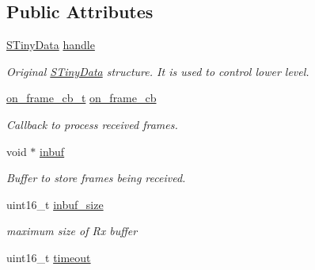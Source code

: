\subsection*{Public Attributes}
\begin{DoxyCompactItemize}
\item 
\hypertarget{structSTinyHdData___a0df5a323cbbfd49fb138b14bca73f14c}{}\hyperlink{structSTinyData}{S\+Tiny\+Data} \hyperlink{structSTinyHdData___a0df5a323cbbfd49fb138b14bca73f14c}{handle}\label{structSTinyHdData___a0df5a323cbbfd49fb138b14bca73f14c}

\begin{DoxyCompactList}\small\item\em Original \hyperlink{structSTinyData}{S\+Tiny\+Data} structure. It is used to control lower level. \end{DoxyCompactList}\item 
\hypertarget{structSTinyHdData___abf8a0eb5006769a92adc186554a3a1c0}{}\hyperlink{tiny__layer2_8h_ad6bf709565b8aecb9e6ecf196f219d54}{on\+\_\+frame\+\_\+cb\+\_\+t} \hyperlink{structSTinyHdData___abf8a0eb5006769a92adc186554a3a1c0}{on\+\_\+frame\+\_\+cb}\label{structSTinyHdData___abf8a0eb5006769a92adc186554a3a1c0}

\begin{DoxyCompactList}\small\item\em Callback to process received frames. \end{DoxyCompactList}\item 
\hypertarget{structSTinyHdData___a69a6bb34b580bcfa5e13112cb7652d1d}{}void $\ast$ \hyperlink{structSTinyHdData___a69a6bb34b580bcfa5e13112cb7652d1d}{inbuf}\label{structSTinyHdData___a69a6bb34b580bcfa5e13112cb7652d1d}

\begin{DoxyCompactList}\small\item\em Buffer to store frames being received. \end{DoxyCompactList}\item 
\hypertarget{structSTinyHdData___adbad190a4b54eccd4da6f3c3305a54f1}{}uint16\+\_\+t \hyperlink{structSTinyHdData___adbad190a4b54eccd4da6f3c3305a54f1}{inbuf\+\_\+size}\label{structSTinyHdData___adbad190a4b54eccd4da6f3c3305a54f1}

\begin{DoxyCompactList}\small\item\em maximum size of Rx buffer \end{DoxyCompactList}\item 
\hypertarget{structSTinyHdData___a7ca4e5b23cf480d93317245010bcbe73}{}uint16\+\_\+t \hyperlink{structSTinyHdData___a7ca4e5b23cf480d93317245010bcbe73}{timeout}\label{structSTinyHdData___a7ca4e5b23cf480d93317245010bcbe73}


\end{DoxyCompactItemize}
